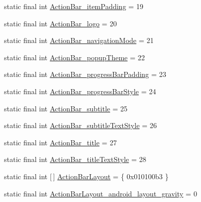 \begin{DoxyCompactItemize}
\item 
static final int \mbox{\hyperlink{classcom_1_1google_1_1android_1_1gms_1_1R_1_1styleable_a9cca6f8897790223996502501a099de3}{Action\+Bar\+\_\+item\+Padding}} = 19
\item 
static final int \mbox{\hyperlink{classcom_1_1google_1_1android_1_1gms_1_1R_1_1styleable_a2d62911c0d7a51bc7ac3e32c8316f10c}{Action\+Bar\+\_\+logo}} = 20
\item 
static final int \mbox{\hyperlink{classcom_1_1google_1_1android_1_1gms_1_1R_1_1styleable_ac4e0aaf975974f9e50e4d32183acb4e3}{Action\+Bar\+\_\+navigation\+Mode}} = 21
\item 
static final int \mbox{\hyperlink{classcom_1_1google_1_1android_1_1gms_1_1R_1_1styleable_aa08572aae46a3440e74eeccecd307730}{Action\+Bar\+\_\+popup\+Theme}} = 22
\item 
static final int \mbox{\hyperlink{classcom_1_1google_1_1android_1_1gms_1_1R_1_1styleable_a2544bda6fc295e8162a876769f8a02d6}{Action\+Bar\+\_\+progress\+Bar\+Padding}} = 23
\item 
static final int \mbox{\hyperlink{classcom_1_1google_1_1android_1_1gms_1_1R_1_1styleable_adbeac92ab1caaae21a71103c15b62549}{Action\+Bar\+\_\+progress\+Bar\+Style}} = 24
\item 
static final int \mbox{\hyperlink{classcom_1_1google_1_1android_1_1gms_1_1R_1_1styleable_a3df240d6f072d52aa0dff8c4853cb7f3}{Action\+Bar\+\_\+subtitle}} = 25
\item 
static final int \mbox{\hyperlink{classcom_1_1google_1_1android_1_1gms_1_1R_1_1styleable_a9e03321d5e66a72a8d72a44d919de3b7}{Action\+Bar\+\_\+subtitle\+Text\+Style}} = 26
\item 
static final int \mbox{\hyperlink{classcom_1_1google_1_1android_1_1gms_1_1R_1_1styleable_a7e7e49899bb6f63f8b495a621496eb82}{Action\+Bar\+\_\+title}} = 27
\item 
static final int \mbox{\hyperlink{classcom_1_1google_1_1android_1_1gms_1_1R_1_1styleable_ae7ec1d3d67f65df855f1afae46addc9e}{Action\+Bar\+\_\+title\+Text\+Style}} = 28
\item 
static final int \mbox{[}$\,$\mbox{]} \mbox{\hyperlink{classcom_1_1google_1_1android_1_1gms_1_1R_1_1styleable_a6dcf1f946705e3944b79827f754f14b5}{Action\+Bar\+Layout}} = \{ 0x010100b3 \}
\item 
static final int \mbox{\hyperlink{classcom_1_1google_1_1android_1_1gms_1_1R_1_1styleable_a3566d6be6b0701e6f7996ec78b9dc89a}{Action\+Bar\+Layout\+\_\+android\+\_\+layout\+\_\+gravity}} = 0
\item 

\end{DoxyCompactItemize}
